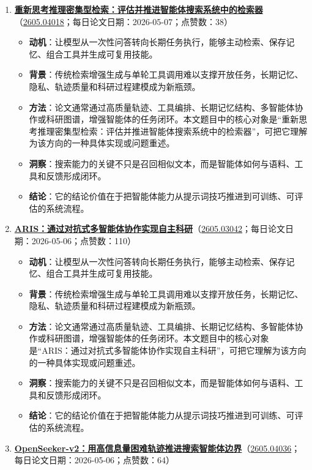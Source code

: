 \begin{enumerate}[leftmargin=1.5em]
\begin{itemize}[leftmargin=1.5em]
  \end{itemize}
  \item \textbf{\href{https://huggingface.co/papers/2605.04018}{重新思考推理密集型检索：评估并推进智能体搜索系统中的检索器}}（\href{https://arxiv.org/abs/2605.04018}{2605.04018}；每日论文日期：2026-05-07；点赞数：38）
  \begin{itemize}[leftmargin=1.5em]
    \item \textbf{动机}：让模型从一次性问答转向长期任务执行，能够主动检索、保存记忆、组合工具并生成可复用技能。
    \item \textbf{背景}：传统检索增强生成与单轮工具调用难以支撑开放任务，长期记忆、隐私、轨迹质量和科研过程建模成为新瓶颈。
    \item \textbf{方法}：论文通常通过高质量轨迹、工具编排、长期记忆结构、多智能体协作或科研图谱，增强智能体的任务闭环。本文题目中的核心对象是“重新思考推理密集型检索：评估并推进智能体搜索系统中的检索器”，可把它理解为该方向的一种具体实现或问题重述。
    \item \textbf{洞察}：搜索能力的关键不只是召回相似文本，而是智能体如何与语料、工具和反馈形成闭环。
    \item \textbf{结论}：它的结论价值在于把智能体能力从提示词技巧推进到可训练、可评估的系统流程。
  \end{itemize}
  \item \textbf{\href{https://huggingface.co/papers/2605.03042}{ARIS：通过对抗式多智能体协作实现自主科研}}（\href{https://arxiv.org/abs/2605.03042}{2605.03042}；每日论文日期：2026-05-06；点赞数：110）
  \begin{itemize}[leftmargin=1.5em]
    \item \textbf{动机}：让模型从一次性问答转向长期任务执行，能够主动检索、保存记忆、组合工具并生成可复用技能。
    \item \textbf{背景}：传统检索增强生成与单轮工具调用难以支撑开放任务，长期记忆、隐私、轨迹质量和科研过程建模成为新瓶颈。
    \item \textbf{方法}：论文通常通过高质量轨迹、工具编排、长期记忆结构、多智能体协作或科研图谱，增强智能体的任务闭环。本文题目中的核心对象是“ARIS：通过对抗式多智能体协作实现自主科研”，可把它理解为该方向的一种具体实现或问题重述。
    \item \textbf{洞察}：搜索能力的关键不只是召回相似文本，而是智能体如何与语料、工具和反馈形成闭环。
    \item \textbf{结论}：它的结论价值在于把智能体能力从提示词技巧推进到可训练、可评估的系统流程。
  \end{itemize}
  \item \textbf{\href{https://huggingface.co/papers/2605.04036}{OpenSeeker-v2：用高信息量困难轨迹推进搜索智能体边界}}（\href{https://arxiv.org/abs/2605.04036}{2605.04036}；每日论文日期：2026-05-06；点赞数：64）

\end{enumerate}
